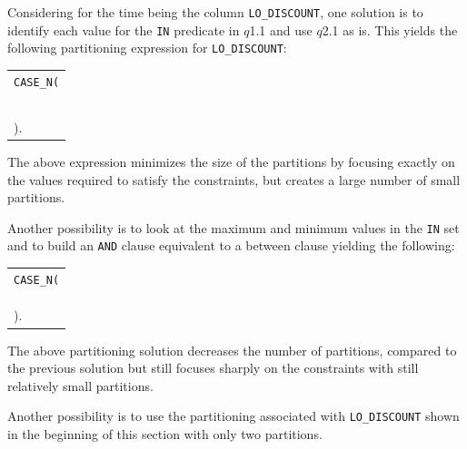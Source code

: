 \documentclass[paper]{ieice}
\begin{document}
Considering for the time being the column {\tt LO\_DISCOUNT}, 
one solution is to identify each value 
for the {\tt IN} predicate in $q$1.1 
and use $q$2.1 as is. This yields the following partitioning expression 
for {\tt LO\_DISCOUNT}:
\begin{center}
\begin{tabular}{l}
{\tt CASE\_N(} \\
\hspace{0.1in}{\tt LO\_DISCOUNT = 1,} \\
\hspace{0.1in}{\tt LO\_DISCOUNT = 4,} \\
\hspace{0.1in}{\tt LO\_DISCOUNT = 5,} \\
\hspace{0.1in}{\tt LO\_DISCOUNT >= 7,} \\
\hspace{0.1in}{\tt NO CASE OR UNKNOWN} \\
{)}. \\
\end{tabular}
\end{center}
The above expression minimizes the size of the partitions 
by focusing exactly on the values required to satisfy the constraints, 
but creates a large number of small partitions. 

Another possibility is to look at the maximum and minimum 
values in the {\tt IN} set and to build an {\tt AND} clause equivalent to 
a between clause yielding the following:
\begin{center}
\begin{tabular}{l}
{\tt CASE\_N(} \\
\hspace{0.1in}{\tt LO\_DISCOUNT >= 1 AND LO\_DISCOUNT <= 5,} \\
\hspace{0.1in}{\tt LO\_DISCOUNT >= 7,} \\
\hspace{0.1in}{\tt NO CASE OR UNKNOWN} \\
{)}. \\
\end{tabular}
\end{center}

\noindent The above partitioning solution decreases the number of partitions, 
compared to the previous solution but still focuses sharply on the constraints 
with still relatively small partitions. 

Another possibility is to use the partitioning associated with {\tt LO\_DISCOUNT} shown 
in the beginning of this section with only two partitions. 
\end{document}
